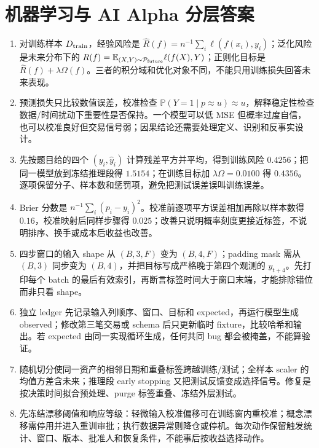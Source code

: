 \chapter{机器学习与 AI Alpha 分层答案}

\begin{enumerate}[leftmargin=*]
  \item 对训练样本 $D_{\rm train}$，经验风险是 $\widehat R(f)=n^{-1}\sum_i\ell(f(x_i),y_i)$；泛化风险是未来分布下的 $R(f)=\mathbb E_{(X,Y)\sim\mathcal P_{\rm future}}\ell(f(X),Y)$；正则化目标是 $\widehat R(f)+\lambda\Omega(f)$。三者的积分域和优化对象不同，不能只用训练损失回答未来表现。
  \item 预测损失只比较数值误差，校准检查 $\mathbb P(Y=1\mid p\approx u)\approx u$，解释稳定性检查数据/时间扰动下重要性是否保持。一个模型可以低 MSE 但概率过度自信，也可以校准良好但交易信号弱；因果结论还需要处理定义、识别和反事实设计。
  \item 先按题目给的四个 $(y_i,\hat y_i)$ 计算残差平方并平均，得到训练风险 $0.4256$；把同一模型放到冻结推理段得 $1.5154$；在训练目标加 $\lambda\Omega=0.0100$ 得 $0.4356$。逐项保留分子、样本数和惩罚项，避免把测试误差误叫训练误差。
  \item Brier 分数是 $n^{-1}\sum_i(p_i-y_i)^2$。校准前逐项平方误差相加再除以样本数得 $0.16$，校准映射后同样步骤得 $0.025$；改善只说明概率刻度更接近标签，不说明排序、换手或成本后收益也改善。
  \item 四步窗口的输入 shape 从 $(B,3,F)$ 变为 $(B,4,F)$；padding mask 需从 $(B,3)$ 同步变为 $(B,4)$，并把目标写成严格晚于第四个观测的 $y_{t+4}$。先打印每个 batch 的最后有效索引，再断言标签时间大于窗口末端，才能排除错位而非只看 shape。
  \item 独立 ledger 先记录输入列顺序、窗口、目标和 expected，再运行模型生成 observed；修改第三笔交易或 schema 后只更新临时 fixture，比较哈希和输出。若 expected 由同一实现循环生成，任何共同 bug 都会被掩盖，不能算验证。
  \item 随机切分使同一资产的相邻日期和重叠标签跨越训练/测试；全样本 scaler 的均值方差含未来；推理段 early stopping 又把测试反馈变成选择信号。修复是按决策时间拟合预处理、purge 标签重叠、冻结外层测试。
  \item 先冻结漂移阈值和响应等级：轻微输入校准偏移可在训练窗内重校准；概念漂移需停用并进入重训审批；执行数据异常则降仓或停机。每次动作保留触发统计、窗口、版本、批准人和恢复条件，不能事后按收益选择动作。
\end{enumerate}
